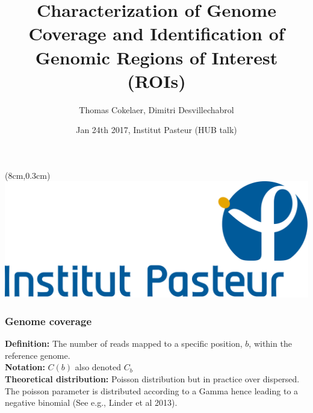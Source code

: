 \documentclass{beamer}
\title[SequanaCoverage]{Characterization of Genome Coverage and Identification 
of Genomic Regions of Interest (ROIs)}
\author[T. Cokelaer, D. Desvillechabrol]{Thomas Cokelaer, Dimitri Desvillechabrol}
\date{Jan 24th 2017, Institut Pasteur (HUB talk)}
\begin{document}
\begin{frame}[plain]
    \titlepage
    \begin{textblock*}{5cm}(8cm,0.3cm)
        \includegraphics[scale=0.09]{../../images/Institut_Pasteur.png}   
    \end{textblock*}
\end{frame}


\begin{frame}
\frametitle{Genome coverage}

\textbf{Definition:} The number of reads mapped to a specific position, $b$, 
within the reference genome. \\
\vspace{1em}
\textbf{Notation:} $ C(b)$ also denoted $C_b$\\
\vspace{1em}
\textbf{Theoretical distribution:} Poisson distribution but in practice over 
dispersed. The poisson parameter is distributed according to a Gamma hence 
leading to a negative binomial (See e.g., Linder et al 2013).
\end{frame}
\end{document}
